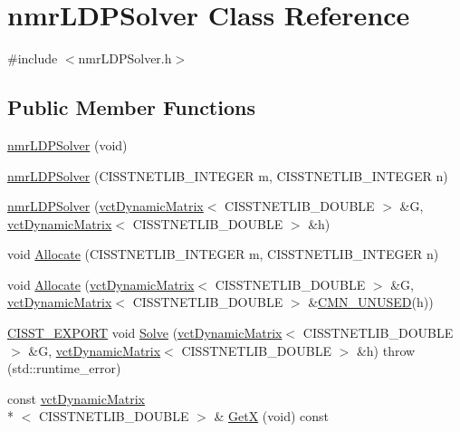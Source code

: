 \hypertarget{classnmr_l_d_p_solver}{\section{nmr\-L\-D\-P\-Solver Class Reference}
\label{classnmr_l_d_p_solver}
}


{\ttfamily \#include $<$nmr\-L\-D\-P\-Solver.\-h$>$}

\subsection*{Public Member Functions}
\begin{DoxyCompactItemize}
\item 
\hyperlink{classnmr_l_d_p_solver_a2ca6b6e49006da3d209024e7160db2d9}{nmr\-L\-D\-P\-Solver} (void)
\item 
\hyperlink{classnmr_l_d_p_solver_a8b7862d241f3580f6b31a47719396cb6}{nmr\-L\-D\-P\-Solver} (C\-I\-S\-S\-T\-N\-E\-T\-L\-I\-B\-\_\-\-I\-N\-T\-E\-G\-E\-R m, C\-I\-S\-S\-T\-N\-E\-T\-L\-I\-B\-\_\-\-I\-N\-T\-E\-G\-E\-R n)
\item 
\hyperlink{classnmr_l_d_p_solver_a93ec0c9e50f72abfe4f82e8196a715b8}{nmr\-L\-D\-P\-Solver} (\hyperlink{classvct_dynamic_matrix}{vct\-Dynamic\-Matrix}$<$ C\-I\-S\-S\-T\-N\-E\-T\-L\-I\-B\-\_\-\-D\-O\-U\-B\-L\-E $>$ \&G, \hyperlink{classvct_dynamic_matrix}{vct\-Dynamic\-Matrix}$<$ C\-I\-S\-S\-T\-N\-E\-T\-L\-I\-B\-\_\-\-D\-O\-U\-B\-L\-E $>$ \&h)
\item 
void \hyperlink{classnmr_l_d_p_solver_a524b7eeead23153401f96e4d932f35f7}{Allocate} (C\-I\-S\-S\-T\-N\-E\-T\-L\-I\-B\-\_\-\-I\-N\-T\-E\-G\-E\-R m, C\-I\-S\-S\-T\-N\-E\-T\-L\-I\-B\-\_\-\-I\-N\-T\-E\-G\-E\-R n)
\item 
void \hyperlink{classnmr_l_d_p_solver_a7707014b8435c8c5b99cc31b50e2cafa}{Allocate} (\hyperlink{classvct_dynamic_matrix}{vct\-Dynamic\-Matrix}$<$ C\-I\-S\-S\-T\-N\-E\-T\-L\-I\-B\-\_\-\-D\-O\-U\-B\-L\-E $>$ \&G, \hyperlink{classvct_dynamic_matrix}{vct\-Dynamic\-Matrix}$<$ C\-I\-S\-S\-T\-N\-E\-T\-L\-I\-B\-\_\-\-D\-O\-U\-B\-L\-E $>$ \&\hyperlink{cmn_portability_8h_a021894e2626935fa2305434b1e893ff6}{C\-M\-N\-\_\-\-U\-N\-U\-S\-E\-D}(h))
\item 
\hyperlink{cmn_export_macros_8h_a99393e0c3ac434b2605235bbe20684f8}{C\-I\-S\-S\-T\-\_\-\-E\-X\-P\-O\-R\-T} void \hyperlink{classnmr_l_d_p_solver_a6d849aede8a216bfe149fa3a3bfb0a9e}{Solve} (\hyperlink{classvct_dynamic_matrix}{vct\-Dynamic\-Matrix}$<$ C\-I\-S\-S\-T\-N\-E\-T\-L\-I\-B\-\_\-\-D\-O\-U\-B\-L\-E $>$ \&G, \hyperlink{classvct_dynamic_matrix}{vct\-Dynamic\-Matrix}$<$ C\-I\-S\-S\-T\-N\-E\-T\-L\-I\-B\-\_\-\-D\-O\-U\-B\-L\-E $>$ \&h)  throw (std\-::runtime\-\_\-error)
\item 
const \hyperlink{classvct_dynamic_matrix}{vct\-Dynamic\-Matrix}\\*
$<$ C\-I\-S\-S\-T\-N\-E\-T\-L\-I\-B\-\_\-\-D\-O\-U\-B\-L\-E $>$ \& \hyperlink{classnmr_l_d_p_solver_ad3a6584125d6ebfe629b9edc3312a536}{Get\-X} (void) const 
\end{DoxyCompactItemize}
